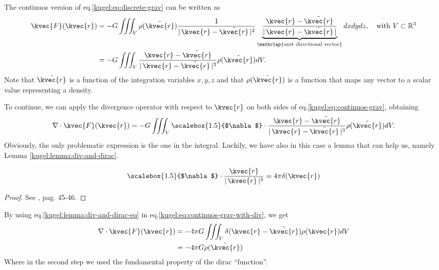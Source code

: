 The continuos version of eq.\eqref{kugel:eq:discrete-grav} can be written as
\begin{align}
  \kvec{F}(\kvec{r}) &= -G \iiint_{V} \rho(\tilde{\kvec{r}})\frac{1}{|\, \kvec{r}-\tilde{\kvec{r}} \,|^2}\underbrace{\frac{\kvec{r}-\tilde{\kvec{r}}}{|\, \kvec{r}-\tilde{\kvec{r}} \,|}}_{\mathclap{\text{unit directional vector}}}dxdydz, \quad \text{with } V \subset \mathbb{R}^3 \nonumber \\
                     &= -G \iiint_{V}\frac{\kvec{r}-\tilde{\kvec{r}}}{|\, \kvec{r}-\tilde{\kvec{r}} \,|^3} \rho(\tilde{\kvec{r}})dV. \label{kugel:eq:continuos-grav} 
\end{align}
Note that $\tilde{\kvec{r}}$ is a function of the integration variables $x,y,z$ and that $\rho(\tilde{\kvec{r}})$ is a function that maps any vector to a scalar value representing a density.

To continue, we can apply the divergence operator with respect to $\kvec{r}$ on both sides of eq.\eqref{kugel:eq:continuos-grav}, obtaining 
\begin{equation}
  \nabla \cdot  \kvec{F}(\kvec{r}) = -G \iiint_{V} \text{\scalebox{1.5}{$\nabla$}} \cdot \frac{\kvec{r}-\tilde{\kvec{r}}}{|\, \kvec{r}-\tilde{\kvec{r}} \,|^3} \rho(\tilde{\kvec{r}})dV. \label{kugel:eq:continuos-grav-with-div} 
\end{equation}
Obviously, the only problematic expression is the one in the integral. Luckily, we have also in this case a lemma that can help us, namely Lemma \ref{kugel:lemma:div-and-dirac}.
\begin{lemma}
  \label{kugel:lemma:div-and-dirac}
  \begin{equation}
    \text{\scalebox{1.5}{$\nabla$}} \cdot \frac{\kvec{r}}{|\,\kvec{r}\,|^3}=4\pi \delta(\kvec{r}) \label{kugel:lemma:div-and-dirac-eq}
  \end{equation}
\end{lemma}
\begin{proof}
  See \cite{proof-relation-divergence&dirac}, pag. 45-46.
\end{proof}
By using eq.\eqref{kugel:lemma:div-and-dirac-eq} in eq.\eqref{kugel:eq:continuos-grav-with-div}, we get
\begin{align*}
  \nabla \cdot \kvec{F}(\kvec{r}) &= -4\pi G \iiint_{V} \delta(\kvec{r}-\tilde{\kvec{r}}) \rho(\kvec{r}) dV \\
                  &= -4\pi G \rho(\tilde{\kvec{r}})
\end{align*}
Where in the second step we used the fundamental property of the dirac ``function''.

